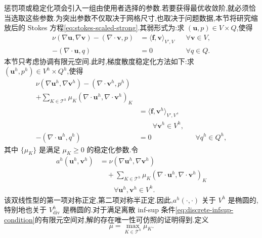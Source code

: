 \begin{note}[梯度散度稳定化]\label{note:stokes-grad-div-method}
惩罚项或稳定化项会引入一组由使用者选择的参数.若要获得最优收敛阶,就必须恰当选取这些参数.为突出参数不仅取决于网格尺寸,也取决于问题数据,本节将研究缩放后的 Stokes 方程\cref{eq:stokes-scaled-strong}.其弱形式为:求 $(\bm{u},p)\in V\times Q$,使得
\begin{equation}\label{eq:stokes-grad-div-scaled-weak}
\begin{aligned}
 \nu(\nabla\bm{u},\nabla\bm{v})
   -(\nabla\cdot\bm{v},p)
   &=\langle\bm{f},\bm{v}\rangle_{V',V}
     &&\forall\bm{v}\in V,\\
 -(\nabla\cdot\bm{u},q)&=0
     &&\forall q\in Q.
\end{aligned}
\end{equation}
本节只考虑协调有限元空间.此时,梯度散度稳定化方法如下:求 $(\bm{u}^h,p^h)\in V^h\times Q^h$,使得
\begin{equation}\label{eq:stokes-grad-div-method}
\begin{aligned}
 \nu(\nabla\bm{u}^h,\nabla\bm{v}^h)
   -(\nabla\cdot\bm{v}^h,p^h)
   \\
   +\sum_{K\in\mathcal{T}^h}
      \mu_K(\nabla\cdot\bm{u}^h,
            \nabla\cdot\bm{v}^h)_K\\
   &=\langle\bm{f},\bm{v}^h\rangle_{V',V},\\
   &\qquad\forall\bm{v}^h\in V^h,\\
 -(\nabla\cdot\bm{u}^h,q^h)&=0
     &&\forall q^h\in Q^h,
\end{aligned}
\end{equation}
其中 $\{\mu_K\}$ 是满足 $\mu_K\geq0$ 的稳定化参数.令
\[
\begin{aligned}
 a^h(\bm{u}^h,\bm{v}^h)
 &= \nu(\nabla\bm{u}^h,\nabla\bm{v}^h)\\
 &\quad+\sum_{K\in\mathcal{T}^h}
      \mu_K(\nabla\cdot\bm{u}^h,
            \nabla\cdot\bm{v}^h)_K\\
 &\qquad\forall\bm{u}^h,\bm{v}^h\in V^h.
\end{aligned}
\]
该双线性型的第一项对称正定,第二项对称半正定.因此,$a^h(\cdot,\cdot)$ 关于 $V^h$ 是椭圆的,特别地也关于 $V^h_{\mathrm{div}}$ 是椭圆的.对于满足离散 inf-sup 条件\cref{eq:discrete-infsup-condition}的有限元空间对,解的存在唯一性可仿照的证明得到.定义
\[
 \mu=\max_{K\in\mathcal{T}^h}\mu_K.
\]
\end{note}

